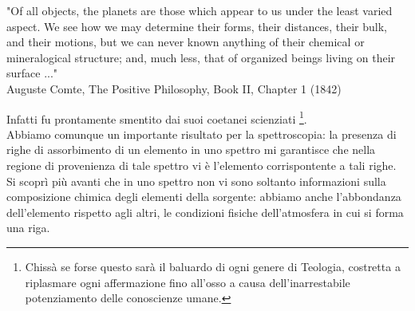 \begin{center}
	"Of all objects, the planets are those which appear to us under the least varied aspect. We see how we may determine their forms, their distances, their bulk, and their motions, but we can never known anything of their chemical or mineralogical structure; and, much less, that of organized beings living on their surface ..." \\
	\null\hfill Auguste Comte, The Positive Philosophy, Book II, Chapter 1 (1842) 
\end{center}
Infatti fu prontamente smentito dai suoi coetanei scienziati \footnote{Chissà se forse questo sarà il baluardo di ogni genere di Teologia, costretta a riplasmare ogni affermazione fino all'osso a causa dell'inarrestabile potenziamento delle conoscienze umane.}.\\
Abbiamo comunque un importante risultato per la spettroscopia: la presenza di righe di assorbimento di un elemento in uno spettro mi garantisce che nella regione di provenienza di tale spettro vi è l'elemento corrispontente a tali righe.\\
Si scoprì più avanti che in uno spettro non vi sono soltanto informazioni sulla composizione chimica degli elementi della sorgente: abbiamo anche l'abbondanza dell'elemento rispetto agli altri, le condizioni fisiche dell'atmosfera in cui si forma una riga. \\
